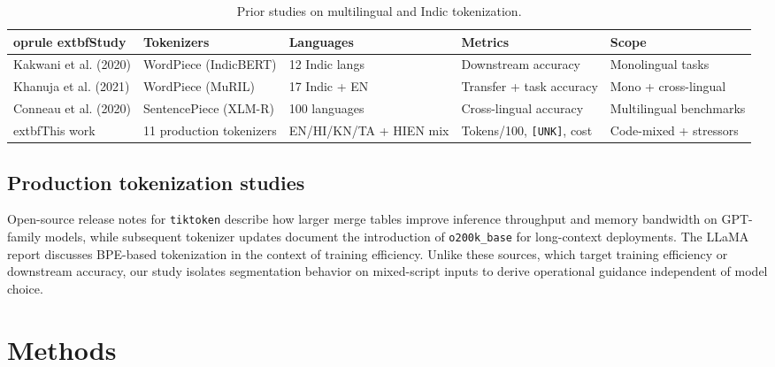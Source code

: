 \documentclass{article}
\begin{document}
\begin{table}[t]
    \centering
    \small
    \caption{Prior studies on multilingual and Indic tokenization.}\label{tab:prior-studies}
    \begingroup
    \setlength{\tabcolsep}{4pt}
    \renewcommand{\arraystretch}{1.15}
    \begin{tabularx}{\linewidth}{p{2.4cm}p{2.8cm}p{2.2cm}p{2.4cm}X}
    	oprule
    	extbf{Study} & \textbf{Tokenizers} & \textbf{Languages} & \textbf{Metrics} & \textbf{Scope} \\
    \midrule
        Kakwani et al. (2020) & WordPiece (IndicBERT) & 12 Indic langs & Downstream accuracy & Monolingual tasks \\
        Khanuja et al. (2021) & WordPiece (MuRIL) & 17 Indic + EN & Transfer + task accuracy & Mono + cross-lingual \\
        Conneau et al. (2020) & SentencePiece (XLM-R) & 100 languages & Cross-lingual accuracy & Multilingual benchmarks \\
        	extbf{This work} & 11 production tokenizers & EN/HI/KN/TA + HI\textendash{}EN mix & Tokens/100, \texttt{[UNK]}, cost & Code-mixed + stressors \\
    \bottomrule
    \end{tabularx}
    \endgroup
\end{table}

\subsection{Production tokenization studies}
Open-source release notes for \texttt{tiktoken} describe how larger merge tables improve inference throughput and memory bandwidth on GPT-family models\cite{tiktoken}, while subsequent tokenizer updates document the introduction of \texttt{o200k\_base} for long-context deployments\cite{OpenAI2024Tokenizer}. The LLaMA report discusses BPE-based tokenization in the context of training efficiency\cite{Touvron2023LLaMA}. Unlike these sources, which target training efficiency or downstream accuracy, our study isolates segmentation behavior on mixed-script inputs to derive operational guidance independent of model choice.

\section{Methods}
\end{document}
